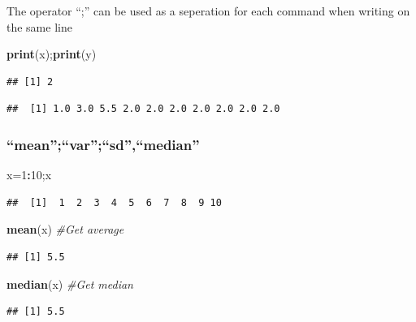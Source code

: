 \documentclass[]{article}
\newenvironment{Shaded}{\begin{snugshade}}{\end{snugshade}}
\newcommand{\CommentTok}[1]{\textcolor[rgb]{0.56,0.35,0.01}{\textit{#1}}}
\newcommand{\DecValTok}[1]{\textcolor[rgb]{0.00,0.00,0.81}{#1}}
\newcommand{\KeywordTok}[1]{\textcolor[rgb]{0.13,0.29,0.53}{\textbf{#1}}}
\newcommand{\NormalTok}[1]{#1}
\newcommand{\OperatorTok}[1]{\textcolor[rgb]{0.81,0.36,0.00}{\textbf{#1}}}
\begin{document}
The operator ``;'' can be used as a seperation for each command when
writing on the same line

\begin{Shaded}
\begin{Highlighting}[]
\KeywordTok{print}\NormalTok{(x);}\KeywordTok{print}\NormalTok{(y)}
\end{Highlighting}
\end{Shaded}

\begin{verbatim}
## [1] 2
\end{verbatim}

\begin{verbatim}
##  [1] 1.0 3.0 5.5 2.0 2.0 2.0 2.0 2.0 2.0 2.0
\end{verbatim}

\hypertarget{meanvarsdmedian}{%
\subsubsection{``mean'';``var'';``sd'',``median''}\label{meanvarsdmedian}}

\begin{Shaded}
\begin{Highlighting}[]
\NormalTok{x=}\DecValTok{1}\OperatorTok{:}\DecValTok{10}\NormalTok{;x}
\end{Highlighting}
\end{Shaded}

\begin{verbatim}
##  [1]  1  2  3  4  5  6  7  8  9 10
\end{verbatim}

\begin{Shaded}
\begin{Highlighting}[]
\KeywordTok{mean}\NormalTok{(x) }\CommentTok{#Get average}
\end{Highlighting}
\end{Shaded}

\begin{verbatim}
## [1] 5.5
\end{verbatim}

\begin{Shaded}
\begin{Highlighting}[]
\KeywordTok{median}\NormalTok{(x) }\CommentTok{#Get median}
\end{Highlighting}
\end{Shaded}

\begin{verbatim}
## [1] 5.5
\end{verbatim}
\end{document}
